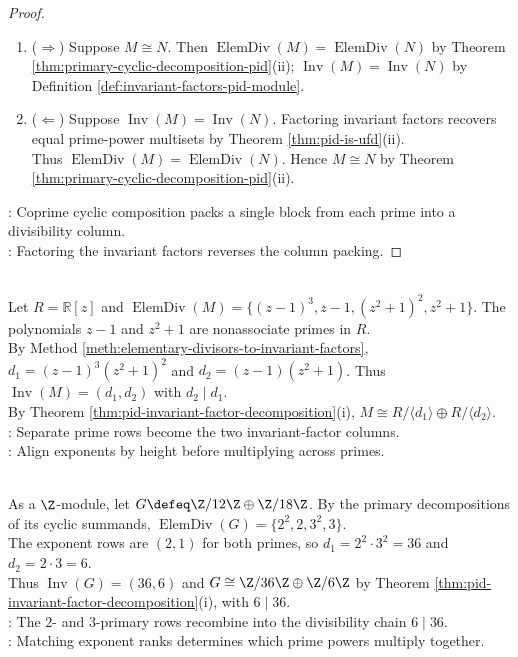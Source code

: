 \begin{theorem}
\begin{proof}
\begin{enumerate}[label=(\roman*)]
\item[$(ii)$] ($\Rightarrow$) Suppose $M\cong N$. Then $\operatorname{ElemDiv}(M)=\operatorname{ElemDiv}(N)$ by Theorem \ref{thm:primary-cyclic-decomposition-pid}(ii); $\operatorname{Inv}(M)=\operatorname{Inv}(N)$ by Definition \ref{def:invariant-factors-pid-module}.
\item[$(ii)$] ($\Leftarrow$) Suppose $\operatorname{Inv}(M)=\operatorname{Inv}(N)$. Factoring  invariant factors recovers equal prime-power multisets by Theorem \ref{thm:pid-is-ufd}(ii).\\
Thus $\operatorname{ElemDiv}(M)=\operatorname{ElemDiv}(N)$. Hence $M\cong N$ by Theorem \ref{thm:primary-cyclic-decomposition-pid}(ii).
\end{enumerate}
\noindent
{}: Coprime cyclic composition packs a single block from each prime into a divisibility column.\\
: Factoring the invariant factors reverses the column packing.
\end{proof}
\end{theorem}

\begin{example} \label{ex:elementary-divisors-to-invariant-factors-polynomial-module} \\
Let $R=\mathbb{R}[z]$ and $\operatorname{ElemDiv}(M)=\{(z-1)^3,z-1,(z^2+1)^2,z^2+1\}$. The polynomials $z-1$ and $z^2+1$ are nonassociate primes in $R$.\\
By Method \ref{meth:elementary-divisors-to-invariant-factors}, $d_1=(z-1)^3(z^2+1)^2$ and $d_2=(z-1)(z^2+1)$. Thus $\operatorname{Inv}(M)=(d_1,d_2)$ with $d_2\mid d_1$.\\
By Theorem \ref{thm:pid-invariant-factor-decomposition}(i), $M\cong R/\langle d_1\rangle\oplus R/\langle d_2\rangle$.\\
: Separate prime rows become the two invariant-factor columns.\\
: Align exponents by height before multiplying across primes.
\end{example}

\begin{example} \label{ex:elementary-divisors-recombine-to-invariant-factors} \\
As a $\Z$-module, let $G\defeq\Z/12\Z\oplus\Z/18\Z$. By the primary decompositions of its cyclic summands, $\operatorname{ElemDiv}(G)=\{2^2,2,3^2,3\}$.\\
The exponent rows are $(2,1)$ for both primes, so $d_1=2^2\cdot3^2=36$ and $d_2=2\cdot3=6$.\\
Thus $\operatorname{Inv}(G)=(36,6)$ and $G\cong\Z/36\Z\oplus\Z/6\Z$ by Theorem \ref{thm:pid-invariant-factor-decomposition}(i), with $6\mid36$.\\
: The $2$- and $3$-primary rows recombine into the divisibility chain $6\mid36$.\\
: Matching exponent ranks determines which prime powers multiply together.
\end{example}

